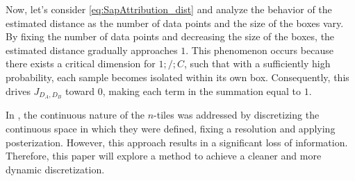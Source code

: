 \noindent Now, let’s consider \cref{eq:SapAttribution_dist} and analyze the behavior of the estimated distance as the number of data points and the size of the boxes vary. By fixing the number of data points and decreasing the size of the boxes, the estimated distance gradually approaches $1$. This phenomenon occurs because there exists a critical dimension for $1;/;C$, such that with a sufficiently high probability, each sample becomes isolated within its own box. Consequently, this drives $J_{D_A,D_B}$ toward $0$, making each term in the summation equal to $1$.

\bigskip
In \cite{thesis}, the continuous nature of the $n$-tiles was addressed by discretizing the continuous space in which they were defined, fixing a resolution and applying posterization. However, this approach results in a significant loss of information. Therefore, this paper will explore a method to achieve a cleaner and more dynamic discretization.
